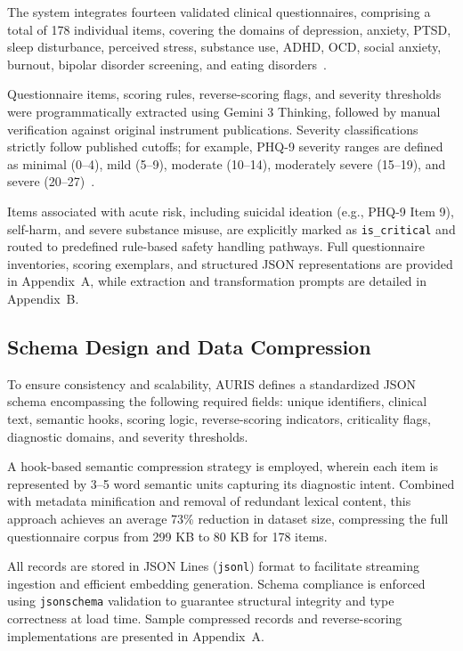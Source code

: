\documentclass[sigconf]{acmart}
\begin{document}
The system integrates fourteen validated clinical questionnaires, comprising a total of 178 individual items, covering the domains of depression, anxiety, PTSD, sleep disturbance, perceived stress, substance use, ADHD, OCD, social anxiety, burnout, bipolar disorder screening, and eating disorders~\cite{kroenke_phq-9_2001,levis_accuracy_2019,spitzer_brief_2006,forkus_posttraumatic_2023,bastien_validation_2001,cohen_global_1983,kessler_world_2005,saunders_development_1993,skinner_drug_1982,wootton_contemporary_2015,mattick_development_1998,maslach_maslach_1997,hirschfeld_development_2000,gormally_assessment_1982}.

Questionnaire items, scoring rules, reverse-scoring flags, and severity thresholds were programmatically extracted using Gemini 3 Thinking, followed by manual verification against original instrument publications. Severity classifications strictly follow published cutoffs; for example, PHQ-9 severity ranges are defined as minimal (0--4), mild (5--9), moderate (10--14), moderately severe (15--19), and severe (20--27)~\cite{hua_large_2025}.

Items associated with acute risk, including suicidal ideation (e.g., PHQ-9 Item 9), self-harm, and severe substance misuse, are explicitly marked as \texttt{is\_critical} and routed to predefined rule-based safety handling pathways. Full questionnaire inventories, scoring exemplars, and structured JSON representations are provided in Appendix~A, while extraction and transformation prompts are detailed in Appendix~B.

\subsection{Schema Design and Data Compression}

To ensure consistency and scalability, AURIS defines a standardized JSON schema encompassing the following required fields: unique identifiers, clinical text, semantic hooks, scoring logic, reverse-scoring indicators, criticality flags, diagnostic domains, and severity thresholds.

A hook-based semantic compression strategy is employed, wherein each item is represented by 3--5 word semantic units capturing its diagnostic intent. Combined with metadata minification and removal of redundant lexical content, this approach achieves an average 73\% reduction in dataset size, compressing the full questionnaire corpus from 299 KB to 80 KB for 178 items.

All records are stored in JSON Lines (\texttt{jsonl}) format to facilitate streaming ingestion and efficient embedding generation. Schema compliance is enforced using \texttt{jsonschema} validation to guarantee structural integrity and type correctness at load time. Sample compressed records and reverse-scoring implementations are presented in Appendix~A.
\end{document}
